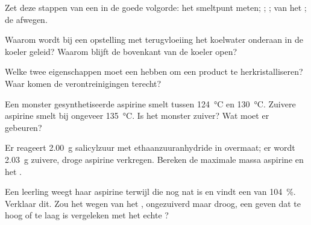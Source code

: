 \begin{exercise}[$\star$]\label{exo:g10:synthesis-yield:2}
Zet deze stappen van een  in de goede volgorde: het smeltpunt
meten; ; ; 
van het ; de  afwegen.
\end{exercise}

\begin{exercise}[$\star$]\label{exo:g10:synthesis-yield:3}
Waarom wordt bij een opstelling met terugvloeiing het koelwater onderaan
in de koeler geleid? Waarom blijft de bovenkant van de koeler open?
\end{exercise}

\begin{exercise}[$\star$]\label{exo:g10:synthesis-yield:4}
Welke twee eigenschappen moet een  hebben om een product te
herkristalliseren? Waar komen de verontreinigingen terecht?
\end{exercise}

\begin{exercise}[$\star$]\label{exo:g10:synthesis-yield:5}
Een monster gesynthetiseerde aspirine smelt tussen \qty{124}{\celsius} en
\qty{130}{\celsius}. Zuivere aspirine smelt bij ongeveer
\qty{135}{\celsius}. Is het monster zuiver? Wat moet er gebeuren?
\end{exercise}

\begin{exercise}[$\star\star$]\label{exo:g10:synthesis-yield:6}
Er reageert \qty{2.00}{g} salicylzuur met ethaanzuuranhydride in
overmaat; er wordt \qty{2.03}{g} zuivere, droge aspirine verkregen.
Bereken de maximale massa aspirine en het .
\end{exercise}

\begin{exercise}[$\star\star$]\label{exo:g10:synthesis-yield:7}
Een leerling weegt haar aspirine terwijl die nog nat is en vindt een
 van \qty{104}{\percent}. Verklaar dit. Zou het wegen van het
, ongezuiverd maar droog, een  geven dat te hoog of
te laag is vergeleken met het echte ?
\end{exercise}

